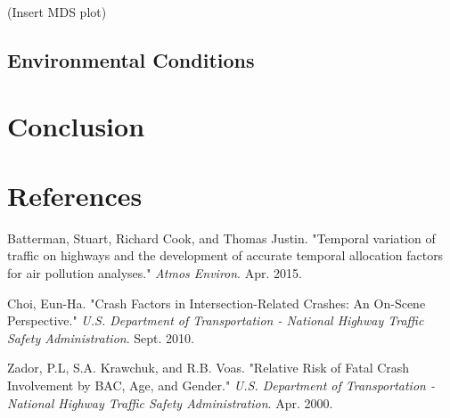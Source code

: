 \documentclass[11pt, oneside]{article}   	%
\begin{document}
(Insert MDS plot) \\



\subsection*{Environmental Conditions}

\section*{Conclusion}

\section*{References}
\begin{hangparas}{1.27cm}{1}
Batterman, Stuart, Richard Cook, and Thomas Justin. "Temporal variation of traffic on highways and the development of accurate temporal allocation factors for air pollution analyses." \textit{Atmos Environ}. Apr. 2015.

Choi, Eun-Ha. "Crash Factors in Intersection-Related Crashes: An On-Scene Perspective." \textit{U.S. Department of Transportation - National Highway Traffic Safety Administration}. Sept. 2010.

Zador, P.L, S.A. Krawchuk, and R.B. Voas. "Relative Risk of Fatal Crash Involvement by BAC, Age, and Gender." \textit{U.S. Department of Transportation - National Highway Traffic Safety Administration}. Apr. 2000.




\end{hangparas}
\end{document}
